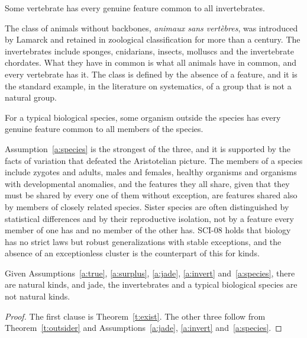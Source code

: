 \documentclass{situationist-preprint}
\begin{document}
\begin{assumption}[Invertebrates]\label{a:invert}
Some vertebrate has every genuine feature common to all invertebrates.
\end{assumption}

The class of animals without backbones, \emph{animaux sans vertèbres}, was introduced by Lamarck and retained in zoological classification for more than a century. The invertebrates include sponges, cnidarians, insects, molluscs and the invertebrate chordates. What they have in common is what all animals have in common, and every vertebrate has it. The class is defined by the absence of a feature, and it is the standard example, in the literature on systematics, of a group that is not a natural group.

\begin{assumption}[Species]\label{a:species}
For a typical biological species, some organism outside the species has every genuine feature common to all members of the species.
\end{assumption}

Assumption~\ref{a:species} is the strongest of the three, and it is supported by the facts of variation that defeated the Aristotelian picture. The members of a species include zygotes and adults, males and females, healthy organisms and organisms with developmental anomalies, and the features they all share, given that they must be shared by every one of them without exception, are features shared also by members of closely related species. Sister species are often distinguished by statistical differences and by their reproductive isolation, not by a feature every member of one has and no member of the other has. SCI-08 holds that biology has no strict laws but robust generalizations with stable exceptions, and the absence of an exceptionless cluster is the counterpart of this for kinds.

\begin{theorem}\label{t:main}
Given Assumptions~\ref{a:true}, \ref{a:surplus}, \ref{a:jade}, \ref{a:invert} and~\ref{a:species}, there are natural kinds, and jade, the invertebrates and a typical biological species are not natural kinds.
\end{theorem}

\begin{proof}
The first clause is Theorem~\ref{t:exist}. The other three follow from Theorem~\ref{t:outsider} and Assumptions~\ref{a:jade}, \ref{a:invert} and~\ref{a:species}.
\end{proof}
\end{document}
